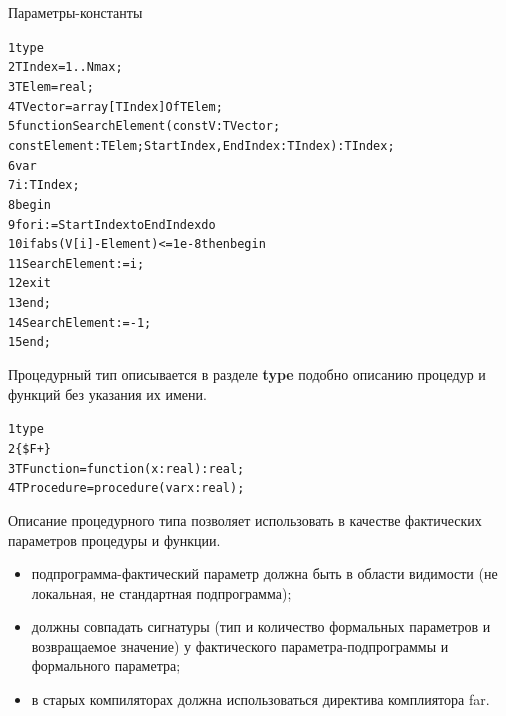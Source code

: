 \documentclass{beamer}
\begin{document}
\begin{frame}[fragile]{Параметры-константы}
\begin{alltt}
 1 type 
 2  TIndex = 1..Nmax;
 3  TElem = real;
 4  TVector = array[TIndex] Of TElem;
 5 function SearchElement(const V:TVector; 
     const Element:TElem; StartIndex, EndIndex: TIndex):TIndex;
 6 var 
 7   i: TIndex;
 8 begin
 9 for i := StartIndex to EndIndex do
10   if abs(V[i] - Element) <= 1e-8 then begin
11     SearchElement := i;        
12     exit
13   end;	
14   SearchElement := -1;
15 end;
\end{alltt}
\end{frame}

\begin{frame}[fragile]
\begin{block}{Процедурный тип}
описывается в разделе \textbf{type} подобно описанию процедур и функций без указания их имени.
\end{block}
\begin{alltt}
 1 type 
 2  \{\$F+\}  
 3  TFunction = function(x:real):real;
 4  TProcedure = procedure(var x:real); 
\end{alltt}
Описание процедурного типа позволяет использовать в качестве фактических параметров процедуры и функции.
\begin{itemize}
\item подпрограмма-фактический параметр должна быть в области видимости (не локальная, не стандартная подпрограмма);
\item должны совпадать сигнатуры (тип и количество формальных параметров и возвращаемое значение) у фактического параметра-подпрограммы и формального параметра;
\item в старых компиляторах должна использоваться директива комплиятора far.
\end{itemize}
\end{frame}
\end{document}
